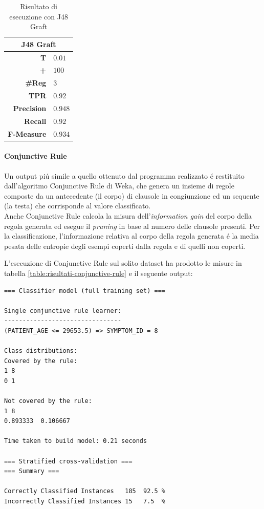 \documentclass[preprint]{acm_proc_article-sp}
\begin{document}
\begin{table}[h]
\centering
\begin{tabular}{|r|l|} \hline
\multicolumn{2}{|c|}{\textbf{J48 Graft}} \\ \hline \hline 
\textbf{T} & $0.01$ \\ \hline
\textbf{+} & $100$ \\ \hline
\textbf{\#Reg} & $3$\\ \hline
\textbf{TPR} & $0.92$ \\ \hline
\textbf{Precision} & $0.948$ \\ \hline
\textbf{Recall} & $0.92$ \\  \hline
\textbf{F-Measure} & $0.934$ \\
\hline\end{tabular}
\caption{Risultato di esecuzione con J48 Graft}
\label{table:risultati-j48-graft}
\end{table}

\paragraph{Conjunctive Rule}
Un output pi\'u simile a quello ottenuto dal programma realizzato \'e restituito dall'algoritmo Conjunctive Rule di Weka, che genera un insieme di regole composte da un antecedente (il corpo) di clausole in congiunzione ed un sequente (la testa) che corrisponde al valore classificato.\\
Anche Conjunctive Rule calcola la misura dell'\textit{information gain} del corpo della regola generata ed esegue il \textit{pruning} in base al numero delle clausole presenti. Per la classificazione, l'informazione relativa al corpo della regola generata \'e la media pesata delle entropie degli esempi coperti dalla regola e di quelli non coperti.

L'esecuzione di Conjunctive Rule sul solito dataset ha prodotto le misure in tabella \ref{table:risultati-conjunctive-rule} e il seguente output:
\begin{verbatim}
=== Classifier model (full training set) ===

Single conjunctive rule learner:
--------------------------------
(PATIENT_AGE <= 29653.5) => SYMPTOM_ID = 8

Class distributions:
Covered by the rule:
1 8 
0 1 

Not covered by the rule:
1 8 
0.893333  0.106667  

Time taken to build model: 0.21 seconds

=== Stratified cross-validation ===
=== Summary ===

Correctly Classified Instances   185  92.5 %
Incorrectly Classified Instances 15   7.5  %
\end{verbatim}
\end{document}
